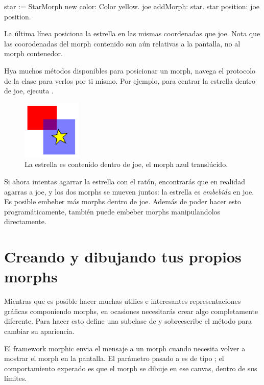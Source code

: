 \documentclass[a4paper,10pt,twoside]{book}
\begin{document}
\begin{code}{}
star := StarMorph new color: Color yellow.
joe addMorph: star.
star position: joe position.
\end{code}

\noindent
La \'ultima l\'inea posiciona la estrella en las mismas coordenadas que joe.
Nota que las coorodenadas del morph contenido son a\'un relativas a la pantalla, no al morph contenedor.

Hya muchos m\'etodos disponibles para posicionar un morph, navega el protocolo  de la clase  para verlos por ti mismo.
Por ejemplo,
para centrar la estrella dentro de joe, ejecuta   .

\begin{figure}[ht]
	\centerline{\includegraphics{joeStar}}
	\caption{La estrella es contenido dentro de joe, el morph azul transl\'ucido.
		}
\end{figure}

Si ahora intentas agarrar la estrella con el rat\'on, encontrar\'as que en realidad agarras a joe, y los dos morphs se mueven juntos: la estrella es \emph{embebida} en joe.
Es posible embeber m\'as morphs dentro de joe.
Adem\'as de poder hacer esto program\'aticamente, tambi\'en puede embeber morphs manipulandolos directamente.

\section{Creando y dibujando tus propios morphs}

Mientras que es posible hacer muchas utilies e interesantes representaciones gr\'aficas componiendo morphs, en ocasiones necesitar\'as crear algo completamente diferente.
Para hacer esto define una subclase de  y sobreescribe el m\'etodo  para cambiar su apariencia.

El framework morphic envia el mensaje  a un morph cuando necesita volver a mostrar el morph en la pantalla. El par\'ametro pasado a  es de tipo ; el comportamiento experado es que el morph se dibuje en ese canvas, dentro de sus límites.
\end{document}
